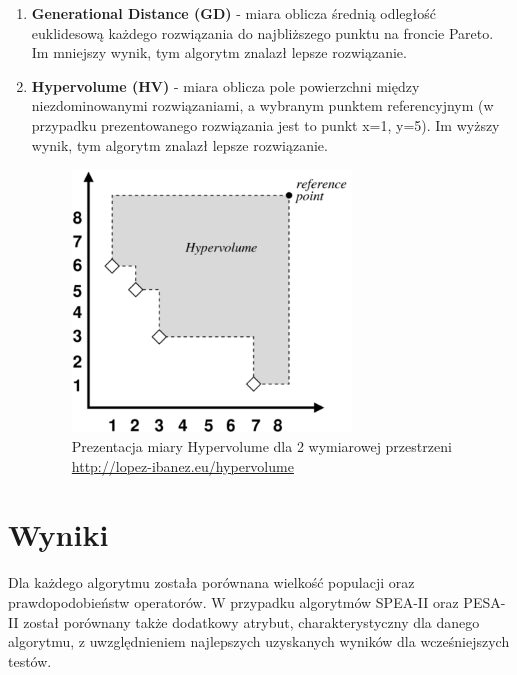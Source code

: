\documentclass{classrep}
\begin{document}
\begin{enumerate}
    \item \textbf{Generational Distance (GD)} - miara oblicza średnią odległość euklidesową każdego rozwiązania do najbliższego punktu na froncie Pareto. Im mniejszy wynik, tym algorytm znalazł lepsze rozwiązanie.
    \item \textbf{Hypervolume (HV)} - miara oblicza pole powierzchni między niezdominowanymi rozwiązaniami, a wybranym punktem referencyjnym (w przypadku prezentowanego rozwiązania jest to punkt x=1, y=5). Im wyższy wynik, tym algorytm znalazł lepsze rozwiązanie.
    \begin{figure}[H]
        \centering
        \includegraphics[width=0.7\textwidth]{img2/hypervolume.png}
        \caption{Prezentacja miary Hypervolume dla 2 wymiarowej przestrzeni \newline \url{http://lopez-ibanez.eu/hypervolume}}
    \end{figure}
    
\end{enumerate}



\newpage
\section{Wyniki}

Dla każdego algorytmu została porównana wielkość populacji oraz prawdopodobieństw operatorów. W przypadku algorytmów SPEA-II oraz PESA-II został porównany także dodatkowy atrybut, charakterystyczny dla danego algorytmu, z uwzględnieniem najlepszych uzyskanych wyników dla wcześniejszych testów.
\end{document}
